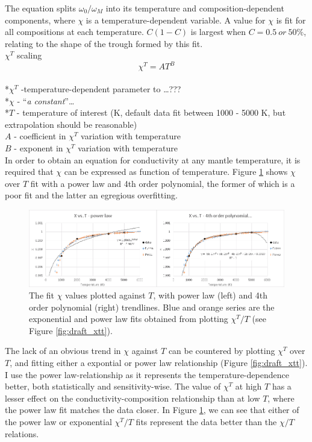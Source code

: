 The equation splits $\omega_{0}/\omega_{M}$ into its temperature and composition-dependent components, where $\chi$ is a temperature-dependent variable. A value for $\chi$ is fit for all compositions at each temperature. $C\left ( 1-C \right )$ is largest when $C=0.5\ or\ 50\%$, relating to the shape of the trough formed by this fit.\\

$\chi^{T}$ scaling 
\begin{equation}%
\chi^{T}=A T^{B}
\label{eq.chi_scale}
\end{equation}%
\\ *$\chi^{T}$ -temperature-dependent parameter to \dots ??? \\
*$\chi$ - \enquote{\textit{a constant}}\dots\\
*$T$ - temperature of interest (K, default data fit between 1000 - 5000 K, but extrapolation should be reasonable)\\                    
$A$ - coefficient in $\chi^{T}$ variation with temperature\\
$B$ - exponent in $\chi^{T}$ variation with temperature\\

In order to obtain an equation for conductivity at any mantle temperature, it is required that $\chi$ can be expressed as function of temperature. Figure \ref{fig:draft_xt} shows $\chi$ over $T$ fit with a power law and 4th order polynomial, the former of which is a poor fit and the latter an egregious overfitting. 

\begin{figure}[h]
  \includegraphics[width=\linewidth]{Figures/draft_XT.png}
  \caption{The fit $\chi$ values plotted against $T$, with power law (left) and 4th order polynomial (right) trendlines. Blue and orange series are the exponential and power law fits obtained from plotting $\chi^T/T$ (see Figure \ref{fig:draft_xtt}).}
  \label{fig:draft_xt}
\end{figure}

The lack of an obvious trend in $\chi$ against $T$ can be countered by plotting $\chi^T$ over $T$, and fitting either a expontial or power law relationship (Figure \ref{fig:draft_xtt}). I use the power law-relationship as it represents the temperature-dependence better, both statistically and sensitivity-wise. The value of $\chi^T$ at high $T$ has a lesser effect on the conductivity-composition relationship than at low $T$, where the power law fit matches the data closer. In Figure \ref{fig:draft_xt}, we can see that either of the power law or exponential $\chi^T/T$ fits represent the data better than the $\chi/T$ relations.\\ 

